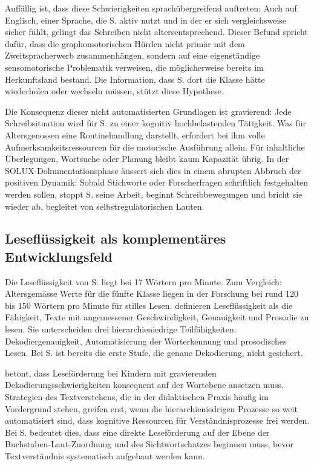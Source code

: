 \documentclass[ngerman, a4paper]{article}
\begin{document}
Auffällig ist, dass diese Schwierigkeiten sprachübergreifend auftreten: Auch auf Englisch,
einer Sprache, die S. aktiv nutzt und in der er sich vergleichsweise sicher fühlt,
gelingt das Schreiben nicht altersentsprechend. Dieser Befund spricht dafür, dass die
graphomotorischen Hürden nicht primär mit dem Zweitspracherwerb zusammenhängen,
sondern auf eine eigenständige sensomotorische Problematik verweisen, die möglicherweise
bereits im Herkunftsland bestand. Die Information, dass S. dort die Klasse hätte
wiederholen oder wechseln müssen, stützt diese Hypothese.

Die Konsequenz dieser nicht automatisierten Grundlagen ist gravierend: Jede
Schreibsituation wird für S. zu einer kognitiv hochbelastenden Tätigkeit. Was für
Altersgenossen eine Routinehandlung darstellt, erfordert bei ihm volle
Aufmerksamkeitsressourcen für die motorische Ausführung allein. Für inhaltliche
Überlegungen, Wortsuche oder Planung bleibt kaum Kapazität übrig. In der
SOLUX-Dokumentationsphase äussert sich dies in einem abrupten Abbruch der positiven
Dynamik: Sobald Stichworte oder Forscherfragen schriftlich festgehalten werden sollen,
stoppt S. seine Arbeit, beginnt Schreibbewegungen und bricht sie wieder ab, begleitet
von selbstregulatorischen Lauten.

\subsection{Leseflüssigkeit als komplementäres Entwicklungsfeld}

Die Leseflüssigkeit von S. liegt bei 17 Wörtern pro Minute. Zum Vergleich: Altersgemässe
Werte für die fünfte Klasse liegen in der Forschung bei rund 120 bis 150 Wörtern pro
Minute für stilles Lesen. \textcite[Kap.\,1--4]{rosebrock2010grundlagen} definieren Leseflüssigkeit als die Fähigkeit,
Texte mit angemessener Geschwindigkeit, Genauigkeit und Prosodie zu lesen. Sie
unterscheiden drei hierarchieniedrige Teilfähigkeiten: Dekodiergenauigkeit,
Automatisierung der Worterkennung und prosodisches Lesen. Bei S. ist bereits die
erste Stufe, die genaue Dekodierung, nicht gesichert.

\textcite[Kap.\,1--4]{gold2018lesenkannmanlernen} betont, dass Leseförderung bei Kindern mit gravierenden
Dekodierungsschwierigkeiten konsequent auf der Wortebene ansetzen muss. Strategien
des Textverstehens, die in der didaktischen Praxis häufig im Vordergrund stehen,
greifen erst, wenn die hierarchieniedrigen Prozesse so weit automatisiert sind, dass
kognitive Ressourcen für Verständnisprozesse frei werden. Bei S. bedeutet dies, dass
eine direkte Leseförderung auf der Ebene der Buchstaben-Laut-Zuordnung und des
Sichtwortschatzes beginnen muss, bevor Textverständnis systematisch aufgebaut werden
kann.
\end{document}
